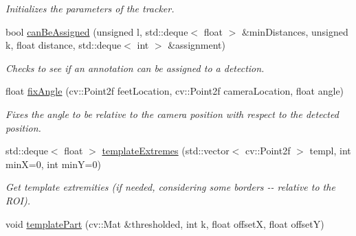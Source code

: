 \begin{DoxyCompactItemize}
\begin{DoxyCompactList}\small\item\em Initializes the parameters of the tracker. \item\end{DoxyCompactList}\item 
\hypertarget{classpeopleDetector_a5126d87e4a0ccf28bc412627c520a557}{
bool \hyperlink{classpeopleDetector_a5126d87e4a0ccf28bc412627c520a557}{canBeAssigned} (unsigned l, std::deque$<$ float $>$ \&minDistances, unsigned k, float distance, std::deque$<$ int $>$ \&assignment)}
\label{classpeopleDetector_a5126d87e4a0ccf28bc412627c520a557}

\begin{DoxyCompactList}\small\item\em Checks to see if an annotation can be assigned to a detection. \item\end{DoxyCompactList}\item 
\hypertarget{classpeopleDetector_a94dcba9ceca4b6551ad63d23e92ea14e}{
float \hyperlink{classpeopleDetector_a94dcba9ceca4b6551ad63d23e92ea14e}{fixAngle} (cv::Point2f feetLocation, cv::Point2f cameraLocation, float angle)}
\label{classpeopleDetector_a94dcba9ceca4b6551ad63d23e92ea14e}

\begin{DoxyCompactList}\small\item\em Fixes the angle to be relative to the camera position with respect to the detected position. \item\end{DoxyCompactList}\item 
\hypertarget{classpeopleDetector_a91339affba5c3baf4fc0c20c9aba583c}{
std::deque$<$ float $>$ \hyperlink{classpeopleDetector_a91339affba5c3baf4fc0c20c9aba583c}{templateExtremes} (std::vector$<$ cv::Point2f $>$ templ, int minX=0, int minY=0)}
\label{classpeopleDetector_a91339affba5c3baf4fc0c20c9aba583c}

\begin{DoxyCompactList}\small\item\em Get template extremities (if needed, considering some borders -\/-\/ relative to the ROI). \item\end{DoxyCompactList}\item 
\hypertarget{classpeopleDetector_afdb309d2ba61756111bc655efc6a58e7}{
void \hyperlink{classpeopleDetector_afdb309d2ba61756111bc655efc6a58e7}{templatePart} (cv::Mat \&thresholded, int k, float offsetX, float offsetY)}
\label{classpeopleDetector_afdb309d2ba61756111bc655efc6a58e7}


\end{DoxyCompactItemize}
